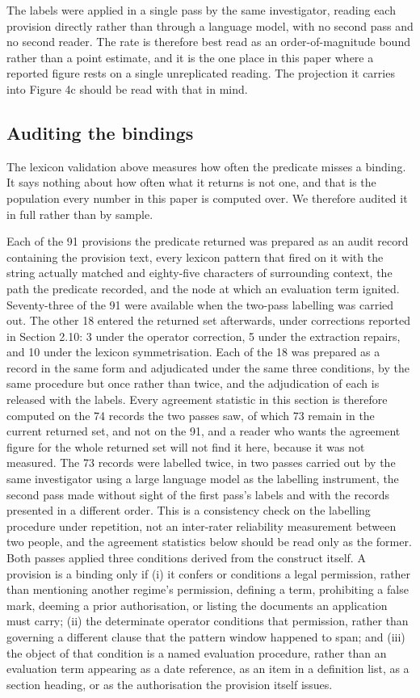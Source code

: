 The labels were applied in a single pass by the same investigator, reading each provision directly rather than through a language model, with no second pass and no second reader. The rate is therefore best read as an order-of-magnitude bound rather than a point estimate, and it is the one place in this paper where a reported figure rests on a single unreplicated reading. The projection it carries into Figure 4c should be read with that in mind.

\subsection{Auditing the bindings}\label{sec:2.7}

The lexicon validation above measures how often the predicate misses a binding. It says nothing about how often what it returns is not one, and that is the population every number in this paper is computed over. We therefore audited it in full rather than by sample.

Each of the 91 provisions the predicate returned was prepared as an audit record containing the provision text, every lexicon pattern that fired on it with the string actually matched and eighty-five characters of surrounding context, the path the predicate recorded, and the node at which an evaluation term ignited. Seventy-three of the 91 were available when the two-pass labelling was carried out. The other 18 entered the returned set afterwards, under corrections reported in Section 2.10: 3 under the operator correction, 5 under the extraction repairs, and 10 under the lexicon symmetrisation. Each of the 18 was prepared as a record in the same form and adjudicated under the same three conditions, by the same procedure but once rather than twice, and the adjudication of each is released with the labels. Every agreement statistic in this section is therefore computed on the 74 records the two passes saw, of which 73 remain in the current returned set, and not on the 91, and a reader who wants the agreement figure for the whole returned set will not find it here, because it was not measured. The 73 records were labelled twice, in two passes carried out by the same investigator using a large language model as the labelling instrument, the second pass made without sight of the first pass's labels and with the records presented in a different order. This is a consistency check on the labelling procedure under repetition, not an inter-rater reliability measurement between two people, and the agreement statistics below should be read only as the former. Both passes applied three conditions derived from the construct itself. A provision is a binding only if (i) it confers or conditions a legal permission, rather than mentioning another regime's permission, defining a term, prohibiting a false mark, deeming a prior authorisation, or listing the documents an application must carry; (ii) the determinate operator conditions that permission, rather than governing a different clause that the pattern window happened to span; and (iii) the object of that condition is a named evaluation procedure, rather than an evaluation term appearing as a date reference, as an item in a definition list, as a section heading, or as the authorisation the provision itself issues.

